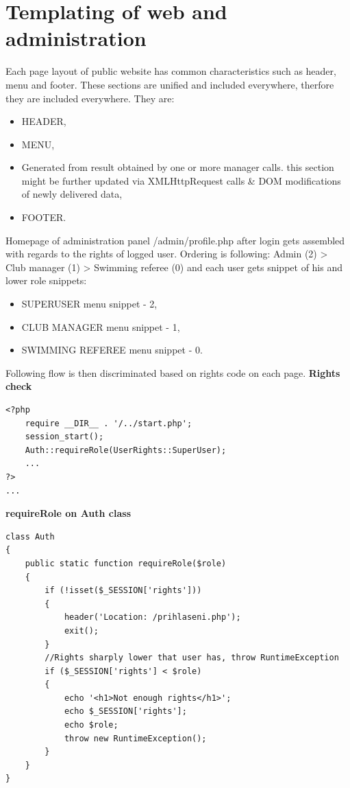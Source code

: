 \section{Templating of web and administration}
Each page layout of public website has common characteristics such as header, menu and footer. These sections are unified and included everywhere, therfore they are included everywhere. They are:
\begin{itemize}
    \item HEADER,
    \item MENU,
    \item Generated from result obtained by one or more manager calls. this section might be further updated via XMLHttpRequest calls \& DOM modifications of newly delivered data,
    \item FOOTER.
\end{itemize}
Homepage of administration panel /admin/profile.php after login gets assembled with regards to the rights of logged user. Ordering is following: Admin (2) \textgreater \: Club manager (1) \textgreater \: Swimming referee (0) and each user gets snippet of his and lower role snippets:
\begin{itemize}
    \item SUPERUSER menu snippet - 2,
    \item CLUB MANAGER menu snippet - 1,
    \item SWIMMING REFEREE menu snippet - 0.
\end{itemize}
Following flow is then discriminated based on rights code on each page. \newline
\textbf{Rights check} 
\begin {lstlisting}
<?php
    require __DIR__ . '/../start.php';
    session_start();
    Auth::requireRole(UserRights::SuperUser);
    ...
?>    
...
\end{lstlisting}
\textbf{requireRole on Auth class} 
\begin{lstlisting}
class Auth
{
	public static function requireRole($role)
	{
		if (!isset($_SESSION['rights']))
        {
			header('Location: /prihlaseni.php');
			exit();
		}
		//Rights sharply lower that user has, throw RuntimeException
		if ($_SESSION['rights'] < $role)
        {
			echo '<h1>Not enough rights</h1>';
			echo $_SESSION['rights'];
			echo $role;
			throw new RuntimeException();
		}
	}
}
\end{lstlisting}

